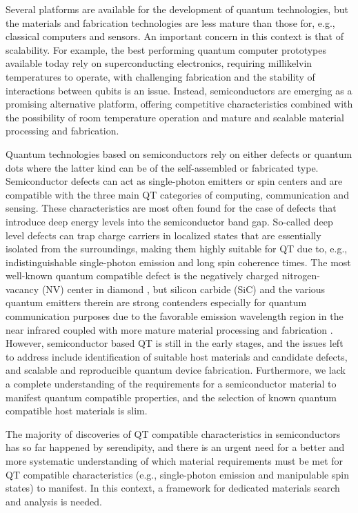 \documentclass[superscriptaddress,unsortedaddress,
 amsmath,amssymb,
 aps,
]{revtex4-2}
\begin{document}
Several platforms are available for the development of quantum technologies, but the materials and fabrication technologies are less mature than those for, e.g., classical computers and sensors. 
An important concern in this context is that of scalability. 
For example, the best performing quantum computer prototypes available today rely on superconducting electronics, requiring millikelvin temperatures to operate, with challenging fabrication and the stability of interactions between qubits is an issue. Instead, semiconductors are emerging as a promising alternative platform, offering competitive characteristics combined with the possibility of room temperature operation and mature and scalable material processing and fabrication.  

Quantum technologies based on semiconductors rely on either defects or quantum dots where the latter kind can be of the self-assembled or fabricated type. 
Semiconductor defects can act as single-photon emitters or spin centers and are compatible with the three main QT categories of computing, communication and sensing.  
These characteristics are most often found for the case of defects that introduce deep energy levels into the semiconductor band gap. So-called deep level defects can trap charge carriers in localized states that are essentially isolated from the surroundings, making them highly suitable for QT due to, e.g., indistinguishable single-photon emission and long spin coherence times. 
The most well-known quantum compatible defect is the negatively charged nitrogen-vacancy (NV) center in diamond \cite{Doherty_2013}, but silicon carbide (SiC) and the various quantum emitters therein are strong contenders especially for quantum communication purposes due to the favorable emission wavelength region in the near infrared coupled with more mature material processing and fabrication \cite{Bathen2021}. 
However, semiconductor based QT is still in the early stages, and the issues left to address include identification of suitable host materials and candidate defects, and scalable and reproducible quantum device fabrication. 
Furthermore, we lack a complete understanding of the requirements for a semiconductor material to manifest quantum compatible properties,  
and the selection of known quantum compatible host materials is slim. 

The majority of discoveries of QT compatible characteristics in semiconductors has so far happened by serendipity, and there is an urgent need for a better and more systematic understanding of which material requirements must be met for QT compatible characteristics (e.g., single-photon emission and manipulable spin states) to manifest. In this context, a framework for dedicated materials search and analysis is needed. 
\end{document}

